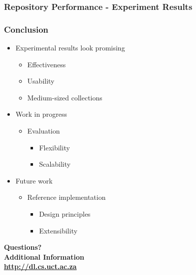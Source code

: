 \documentclass[xcolor=dvitex,t,11pt]{beamer}
\begin{document}
\begin{frame}[fragile]
\frametitle{Repository Performance - Experiment Results}
\centering

\end{frame}

\begin{frame}[fragile]
\frametitle{Conclusion}

\begin{itemize}

\item Experimental results look promising
\begin{itemize}
\item Effectiveness
\item Usability
\item Medium-sized collections
\end{itemize}

\item Work in progress
\begin{itemize}
\item Evaluation
\begin{itemize}
\item Flexibility
\item Scalability
\end{itemize}
\end{itemize}

\item Future work
\begin{itemize}
\item Reference implementation
\begin{itemize} 
\item Design principles
\item Extensibility
\end{itemize}
\end{itemize}

\end{itemize}

\end{frame}

\begin{frame}[fragile]
\begin{center}
\bigskip
\textbf{\fontsize{18}{18}\selectfont Questions?} \\
\textbf{\fontsize{18}{18}\selectfont Additional Information} \\
\bigskip
\textbf{\fontsize{18}{18}\selectfont \url{http://dl.cs.uct.ac.za}}
\end{center}
\end{frame}
\end{document}
